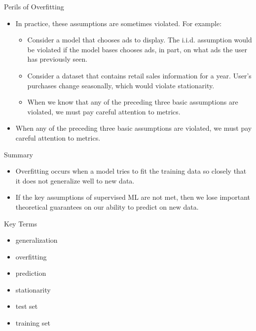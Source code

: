 \documentclass{beamer}
\begin{document}

\begin{frame}{Perils of Overfitting}
\begin{itemize}
    \item In practice, these assumptions are sometimes violated. For example:

\medskip
    \begin{itemize}
        \item Consider a model that chooses ads to display. The i.i.d. assumption would be violated if the model bases chooses ads, in part, on what ads the user has previously seen.

\medskip
        \item Consider a dataset that contains retail sales information for a year. User's purchases change seasonally, which would violate stationarity.

\medskip
        \item When we know that any of the preceding three basic assumptions are violated, we must pay careful attention to metrics.
    \end{itemize}
    
    \medskip
    \item When any of the preceding three basic assumptions are violated, we must pay careful attention to metrics.
\end{itemize}
\end{frame}


\begin{frame}{Summary}
\begin{itemize}
    \item Overfitting occurs when a model tries to fit the training data so closely that it does not generalize well to new data.
    
    \medskip
    \item If the key assumptions of supervised ML are not met, then we lose important theoretical guarantees on our ability to predict on new data.
\end{itemize}
\end{frame}


\begin{frame}{Key Terms}
\begin{itemize}
\item generalization

\medskip
\item overfitting

\medskip
\item prediction

\medskip
\item stationarity

\medskip
\item test set

\medskip
\item training set

\end{itemize}
\end{frame}
\end{document}
